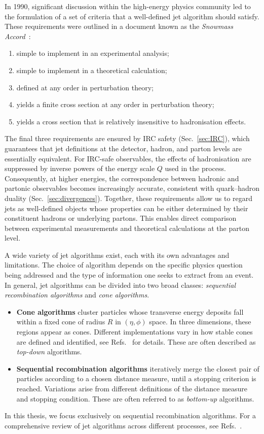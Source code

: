 In 1990, significant discussion within the high-energy physics community 
led to the formulation of a set of criteria that a well-defined jet 
algorithm should satisfy. These requirements were outlined in a document 
known as the \emph{Snowmass Accord}~\cite{Huth:1990mi}:
\begin{enumerate}
    \item simple to implement in an experimental analysis;
    \item simple to implement in a theoretical calculation;
    \item defined at any order in perturbation theory;
    \item yields a finite cross section at any order in perturbation theory;
    \item yields a cross section that is relatively insensitive to hadronisation effects.
\end{enumerate}
The final three requirements are ensured by IRC safety 
(Sec.~\ref{sec:IRC}), which guarantees that jet definitions at the 
detector, hadron, and parton levels are essentially equivalent.
For IRC-safe observables, the effects of hadronisation are suppressed by inverse powers of the energy scale $Q$ used in the process. Consequently, at higher energies, the correspondence between hadronic and partonic observables becomes increasingly accurate, consistent with quark--hadron duality (Sec.~\ref{sec:divergences}). Together, these requirements allow us to regard jets as well-defined objects whose properties can be either determined by their constituent hadrons or underlying partons. This enables direct comparison between experimental measurements and theoretical calculations at the parton level.

A wide variety of jet algorithms exist, each with its own advantages and limitations. The choice of algorithm depends on the specific physics question being addressed and the type of information one seeks to extract from an event. In general, jet algorithms can be divided into two broad classes: \emph{sequential recombination algorithms} and \emph{cone algorithms}.
\begin{itemize}
\item \textbf{Cone algorithms} cluster particles whose transverse
energy deposits fall within a fixed cone of radius $R$ in $(\eta,\phi)$ space. 
In three dimensions, these regions appear as cones. Different implementations vary in how stable 
cones are defined and identified, see Refs.~\cite{Salam:2007xv,Kidonakis:1998bk} 
for details. These are often described as \emph{top-down} algorithms.

    \item \textbf{Sequential recombination algorithms} iteratively merge the closest pair of particles according to a chosen distance measure, until a stopping criterion is reached. Variations arise from different definitions of the distance measure and stopping condition. These are often referred to as \emph{bottom-up} algorithms.
\end{itemize}
In this thesis, we focus exclusively on sequential recombination algorithms. For a comprehensive review of jet algorithms across different processes, see Refs.~\cite{Banfi:2016yyq, Salam:2010nqg}.

